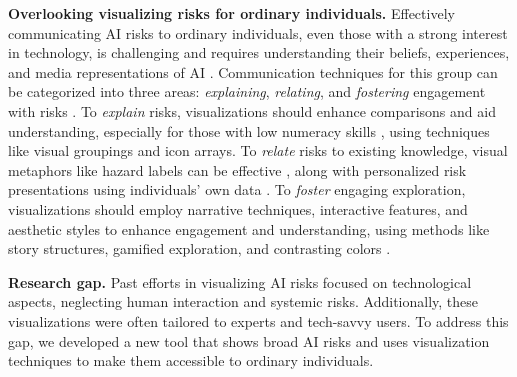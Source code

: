 \smallskip
\noindent\textbf{Overlooking visualizing risks for ordinary individuals.} Effectively communicating AI risks to ordinary individuals, even those with a strong interest in technology, is challenging and requires understanding their beliefs, experiences, and media representations of AI \cite{buccinca2024towards, AINarratives2020}. Communication techniques for this group can be categorized into three areas: \emph{explaining}, \emph{relating}, and \emph{fostering} engagement with risks \cite{visWhatWorks2021}. To \emph{explain} risks, visualizations should enhance comparisons and aid understanding, especially for those with low numeracy skills \cite{visWhatWorks2021}, using techniques like visual groupings and icon arrays. To \emph{relate} risks to existing knowledge, visual metaphors like hazard labels can be effective \cite{data_hazards}, along with personalized risk presentations using individuals' own data \cite{climateChange}. To \emph{foster} engaging exploration, visualizations should employ narrative techniques, interactive features, and aesthetic styles to enhance engagement and understanding, using methods like story structures, gamified exploration, and contrasting colors \cite{narrativeViz, Lavie2004, calculatingEmpires2023}.

\smallskip
\noindent\textbf{Research gap.} Past efforts in visualizing AI risks focused on technological aspects, neglecting human interaction and systemic risks. Additionally, these visualizations were often tailored to experts and tech-savvy users. To address this gap, we developed a new tool that shows broad AI risks and uses visualization techniques to make them accessible to ordinary individuals.